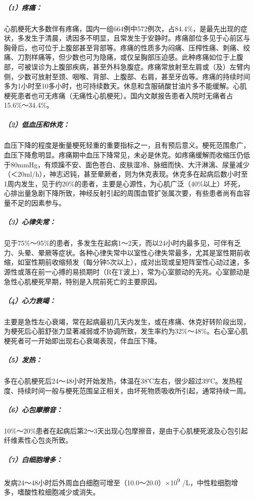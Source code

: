 \subparagraph{（1）疼痛：}

心肌梗死大多数伴有疼痛，国内一组664例中572例次，占84.4\%，是最先出现的症状，多发生于清晨，诱因多不明显，且常发生于安静时。疼痛部位多见于心前区与胸骨后，也可位于上腹部甚至背部等。疼痛的性质多为闷痛、压榨性痛、刺痛、绞痛、刀割样痛等，但少数也可为隐痛，或仅呈胸部压迫感。此种疼痛如位于上腹部，可被误诊为上腹部疾病，甚至外科急腹症。疼痛常放射至左肩或（及）左臂内侧，少数可放射至颈、咽喉、背部、上腹部、右肩，甚至牙齿等。疼痛的持续时间多为1小时至10多小时，也可持续数天。休息和含服硝酸甘油片多不能缓解。心肌梗死患者也可无疼痛（无痛性心肌梗死）。国内文献报告患者入院时无痛者占15.6\%～34.4\%。

\subparagraph{（2）低血压和休克：}

血压下降的程度是衡量梗死轻重的重要指标之一，且有预后意义。梗死范围愈广，血压下降愈明显。疼痛期中血压下降常见，未必是休克。如疼痛缓解而收缩压仍低于80mmHg，有烦躁不安、面色苍白、皮肤湿冷、脉细而快、大汗淋漓、尿量减少（＜20ml/h），神志迟钝，甚至晕厥者，则为休克表现。休克多在起病后数小时至1周内发生，见于约20\%的患者，主要是心源性，为心肌广泛（40\%以上）坏死，心排出量急剧下降所致，神经反射引起的周围血管扩张属次要，有些患者尚有血容量不足的因素参与。

\subparagraph{（3）心律失常：}

见于75\%～95\%的患者，多发生在起病1～2天，而以24小时内最多见，可伴有乏力、头晕、晕厥等症状。各种心律失常中以室性心律失常最多，尤其是室性期前收缩，如室性期前收缩频发（每分钟5次以上），成对出现或呈短阵室性心动过速，多源性或落在前一心搏的易损期时（R在T波上），常为心室颤动的先兆。心室颤动是急性心肌梗死早期，特别是入院前死亡的主要原因。

\subparagraph{（4）心力衰竭：}

主要是急性左心衰竭，常在起病最初几天内发生，或在疼痛、休克好转阶段出现，为梗死后心脏舒张力显著减弱或不协调所致，发生率约为32\%～48\%。右心室心肌梗死者可一开始即出现右心衰竭表现，伴血压下降。

\subparagraph{（5）发热：}

多在心肌梗死后24～48小时开始发热，体温在38℃左右，很少超过39℃。发热程度、持续时间一般与梗死范围呈正相关，由坏死物质吸收所引起，通常持续一周。

\subparagraph{（6）心包摩擦音：}

10\%～20\%患者在起病后第2～3天出现心包摩擦音，是由于心肌梗死波及心包引起纤维素性心包炎所致。

\subparagraph{（7）白细胞增多：}

发病24～48小时后外周血白细胞可增至（10.0～20.0）×10\textsuperscript{9}
/L，中性粒细胞增多，嗜酸性粒细胞减少或消失。

